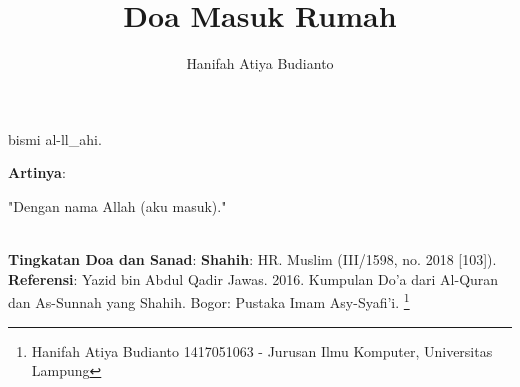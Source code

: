 \documentclass[a4paper,12pt]{article}
\title{\Large Doa Masuk Rumah}
\author{\calligra Hanifah Atiya Budianto}
\begin{document}
\sffamily
\maketitle 
\fullvocalize
{}
\begin{arabtext}
\noindent
bismi al-ll_ahi.\\
\end{arabtext}
\noindent
\textbf{Artinya}:
\par
\indent
"Dengan nama Allah (aku masuk)."\\\\
\par
\noindent
\textbf{Tingkatan Doa dan Sanad}: \textbf{Shahih}: HR. Muslim (III/1598, 
no. 2018 [103]). \\
\textbf{Referensi}: Yazid bin Abdul Qadir Jawas. 2016. Kumpulan Do'a dari
Al-Quran dan As-Sunnah yang Shahih. Bogor: Pustaka Imam Asy-Syafi'i.
\footnote{Hanifah Atiya Budianto 1417051063 - Jurusan Ilmu Komputer,
Universitas Lampung}
\end{document}
